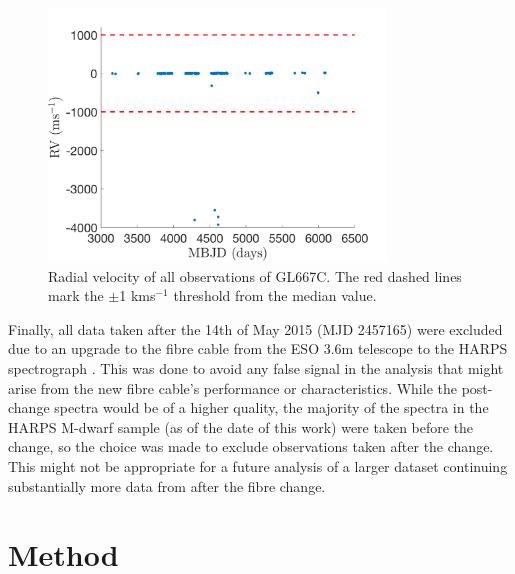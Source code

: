 \begin{figure}
    \centering
    \includegraphics[width=0.8\textwidth]{GL667C_obs.png}
    \caption{Radial velocity of all observations of GL667C. The red dashed lines mark the $\pm$1 kms$^{-1}$ threshold from the median value.}
    \label{figGL667C_RV}
\end{figure}

Finally, all data taken after the 14th of May 2015 (MJD 2457165) were excluded due to an upgrade to the fibre cable from the ESO 3.6m telescope to the HARPS spectrograph \citep{2015LoCurto}. This was done to avoid any false signal in the analysis that might arise from the new fibre cable's performance or characteristics. While the post-change spectra would be of a higher quality, the majority of the spectra in the HARPS M-dwarf sample (as of the date of this work) were taken before the change, so the choice was made to exclude observations taken after the change. This might not be appropriate for a future analysis of a larger dataset continuing substantially more data from after the fibre change. 

\section{Method}
\label{secISVmethod}

